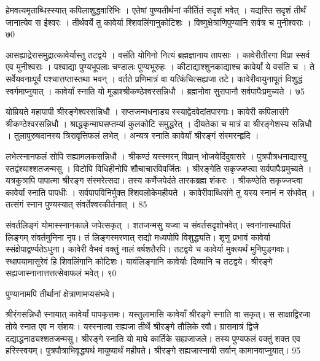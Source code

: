 हेमवत्यमृताब्धिस्स्यात् कपिलाशुद्धवारिभिः ।
 एतेषां पुण्यतीर्थनां कीर्तितं सदृशं भवेत् ।
 यद्यस्ति सदृशं तीर्थं जानात्येव स ईश्वरः ।
 तीर्थवर्ये तु कावेर्या श्शिवलिंगानुकोटिशः ।
 विष्णुक्षेत्राणिपुण्यानि सर्वत्र च मुनीश्वराः ।
 ७0

  आसह्याद्रेरासमुद्रात्कावेर्यास्तु तटद्वये ।
 वसंति योगिनो नित्यं ब्रह्मज्ञानाय तापसाः ।
 कावेरीतीरगा विप्रा स्सर्व एव मुनीश्वराः ।
 पश्वाद्या पुण्यभूपलाः चण्डालः पुण्यभूरुहः ।
 कीटाद्याश्शुनकाद्याश्च कावेर्यां ये वसंति च ।
 ते सर्वेयवनाःपूर्वं पश्चात्तप्तास्तथा भवन् ।
 वर्तते प्रणिमात्रं वा यत्किंचित्सह्यजा तटे।
 कावेरीवायुनापूतं विशुद्धं स्वर्गमाप्नुयात् ।
 कावेर्यां स्नाति यो मूडाश्श्रीकण्ठेश्वरसन्निधौ ।
 ब्रह्मनोवा सुरापानौ सर्वपापैःप्रमुच्यते ।
 ७5

  योम्रियते महापापी श्रीरङ्गेश्वरसन्निधौ ।
 सप्तजन्मधनाड्य स्स्याद्वेदवेदांतपारगाः।
 कावेरी कपिलासंगे श्रीकण्ठेश्वरसन्निधौ ।
 श्राद्धकृन्माघसप्तम्यां कुलकोटि समुद्धरेत् ।
 दीयतेका च मात्रं वा श्रीरङ्गेशस्य सन्निधौ ।
 तुलापुरुषदानस्य त्रिरावृत्तिफलं लभेत् ।
 अन्यत्र स्नाति कावेर्यां श्रीरङ्गं संस्मरन्हृदि ।
 
लभेत्स्नानफलं सोपि सह्यामलकसन्निधौ ।
 श्रीकण्ठं यस्स्मरन् विप्रान् भोजयेदिंदुवासरे ।
 पुत्रपौत्रधनाद्यास्यु स्तद्वंश्याश्शतजन्मसु ।
 विटोपि विधिहीनोपि शौचाचारविवर्जितः ।
 श्रीरङ्गेति सकृज्जप्त्वा सर्वपापैःप्रमुच्यते ।
 यत्रकुत्रापि पापात्मा श्रीरङ्ग संस्मरेत्सदा।
 तस्य कर्णेजपेदंते तारकब्रह्म शंकरः ।
 श्रीकण्ठेति सकृज्जप्त्वा कावेर्यां स्नाति पापधीः ।
 सर्वपापविनिर्मुक्त श्शिवलोकेमहीयते ।
 कावेरीवाब्धिसंगे तु यस्य स्नानं न संभवेत् ।
 तत्संगं स्नान पुण्यस्यात् संवर्तेश्वरकीर्तनात् ।
 85

  संवर्तलिङ्गं योमास्स्नानकाले जपेत्सकृत् ।
 शतजन्मसु यज्वा च संवर्तसदृशोभवेत्।
 स्वनांनास्थापितं लिङ्गम् संवर्तमुनिना नृप।
 तं लिङ्गस्मरणात् सद्यो मध्यपोपि विशुद्ध्यति।
 शृणु प्रभावं कावेर्या स्संक्षेपाद्वर्ण्यतेऽधुना।
 कावेरी वैभवं वक्तुं नालं वर्षशतैरपि।
 तटद्वये च कावेर्या मुक्त्यर्थं मुनिपुङ्गवाः।
 स्थापयामासुरेवं हि शिवलिंगानि कोटिशः।
 यावंलिङ्गानि कावेर्याः दिव्यानि च तटद्वये।
 श्रीरङ्गे सह्यजास्नानात्तत्तत्सेवाफलं भवेत्।
 ९0

  पुण्यानामपि तीर्थानां क्षेत्राणामप्यसंभवे।

श्रीरंगसन्निधौ स्नायात् कावेर्यां पापकृत्तमः।
 यस्तुलामासि कावेयाँ श्रीरङ्गे स्नाति वा सकृत्।
 स साक्षाद्विरजा तोये स्नात एव न संशयः।
 यस्स्नात्वा सह्यजा तीर्थे श्रीरङ्गे तौलिके रवौ।
 ग्रासमात्रं द्विजे दद्याद्धनाढ्यश्शतजन्मसु।
 श्रीरङ्गे स्नाति यो माघे कार्तिके सह्यजाजले।
 तस्य पुण्यफलं वक्तुं शक्त एव हरिस्स्वयम्।
 पुत्रपौत्राभिवृद्ध्यर्थ मायुष्यार्थं महीपते।
 श्रीरङ्गे सह्यजास्नायी सर्वान् कामानवाप्नुयात्।
 95

